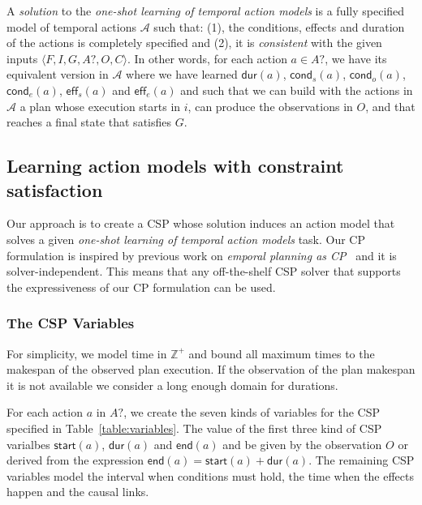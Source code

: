 \documentclass{ecai}
\newcommand{\tup}[1]{{\langle #1 \rangle}}
\newcommand{\eff}{\mathsf{eff}}    %
\newcommand{\cond}{\mathsf{cond}}  %
\newcommand{\dur}{\mathsf{dur}}    %
\newcommand{\start}{\mathsf{start}}%
\newcommand{\en}{\mathsf{end}}     %
\begin{document}
A {\em solution} to the {\em one-shot learning of temporal action models} is a fully specified model of temporal actions $\mathcal{A}$ such that: (1), the conditions, effects and duration of the actions is completely specified and (2), it is {\em consistent} with the given inputs $\tup{F,I,G,A?,O,C}$. In other words, for each action $a \in A?$, we have its equivalent version in $\mathcal{A}$ where we have learned $\dur(a)$, $\cond_s(a)$, $\cond_o(a)$, $\cond_e(a)$, $\eff_s(a)$ and $\eff_e(a)$ and such that we can build with the actions in $\mathcal{A}$ a plan whose execution starts in $i$, can produce the observations in $O$, and that reaches a final state that satisfies $G$. 

\subsection{Learning action models with constraint satisfaction}
\label{subsec:CPformulation}

Our approach is to create a CSP whose solution induces an action model that solves a given {\em one-shot learning of temporal action models} task. Our CP formulation is inspired by previous work on {\em emporal planning as CP}~\cite{vidal2006branching,garrido2009constraint} and it is solver-independent. This means that any off-the-shelf CSP solver that supports the expressiveness of our CP formulation can be used.

\subsubsection{The CSP Variables}
For simplicity, we model time in $\mathbb{Z}^+$ and bound all maximum times to the makespan of the observed plan execution. If the observation of the plan makespan it is not available we consider a long enough domain for durations.

For each action $a$ in $A?$, we create the seven kinds of variables for the CSP specified in Table~\ref{table:variables}. The value of the first three kind of CSP varialbes $\start(a)$, $\dur(a)$ and $\en(a)$ and be given by the observation $O$ or derived from the expression $\en(a)=\start(a)+\dur(a)$. The remaining CSP variables model the interval when conditions must hold, the time when the effects happen and the causal links. 
\end{document}
